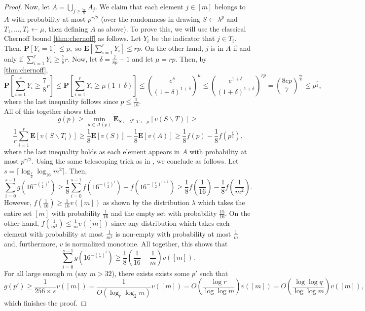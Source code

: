 \documentclass[11pt]{article}%
\numberwithin{theorem}{subsection}
\newcommand{\prob}{\mathbf{P}}
\newcommand{\expect}{\mathbf{E}}
\begin{document}
\begin{proof}
\noindent
Now, let $A = \bigcup_{j \ge \frac{7r}{8}}A_j.$ We claim that each element $j \in [m]$ belongs to $A$ with probability at most $p^{r/2}$ (over the randomness in drawing $S \leftarrow \lambda^p$ and $T_1,\ldots, T_r \leftarrow \mu$, then defining $A$ as above). To prove this, we will use the classical Chernoff bound \cref{thm:chernoff} as follows. Let $Y_i$ be the indicator that $j \in T_i.$ Then, 
$\prob[Y_i = 1]\le p,$ so 
$
\expect[\sum_{i = 1}^rY_i] \le rp.
$ On the other hand, $j$ is in $A$ if and only if 
$\sum_{i = 1}^rY_i\ge \frac{7}{8}r.$ Now, let 
$\delta  = \frac{7}{8p}-1$ and let $\mu = rp.$ Then, by \cref{thm:chernoff},
$$
\prob\left[\sum_{i = 1}^rY_i\ge \frac{7}{8}r\right] \le
\prob\left[\sum_{i = 1}^rY_i\ge \mu (1 + \delta)\right] \le 
\left(
\frac{e^{\delta}}{(1+\delta)^{1+\delta}}
\right)^\mu\le 
\left(
\frac{e^{1+\delta}}{(1+\delta)^{1+\delta}}
\right)^{rp} =
\left(\frac{8ep}{7}\right)^{\frac{7r}{8}}\le p^{\frac{r}{2}},
$$
where the last inequality follows since $p\le\frac{1}{16}.$\\

\noindent
All of this together shows that 
$$
g(p) \ge 
\min_{\mu \in \Delta(p)}\expect_{S\leftarrow \lambda^p, T\leftarrow \mu}[v(S\backslash T)]\ge 
$$
$$
\frac{1}{r}\sum_{i  = 1}^r \expect[v(S\backslash T_i)] \ge 
\frac{1}{8}\expect[v(S)] - 
\frac{1}{8}\expect[v(A)] \ge 
\frac{1}{8}f(p) - \frac{1}{8}f(p^{\frac{r}{2}}),
$$
where the last inequality holds as each element appears in $A$ with probability at most $p^{r/2}.$ Using the same telescoping trick as in \cite{DuttingKL20}, we conclude as follows. Let $s = \lceil\log_{\frac{r}{2}}\log_{16} m^2\rceil.$ Then,
$$
\sum_{i = 0}^{s-1} g(16^{-(\frac{r}{2})^i})\ge 
\frac{1}{8}\sum_{i = 0}^{s-1}
f(16^{-(\frac{r}{2})^i})- 
f(16^{-(\frac{r}{2})^{i+1}}) \ge
\frac{1}{8}f\left(\frac{1}{16}\right) - \frac{1}{8}f\left(\frac{1}{m^2}\right).
$$
However, $f(\frac{1}{16})\ge \frac{1}{16}v([m])$ as shown by the distribution $\lambda$ which takes the entire set $[m]$ with probability $\frac{1}{16}$ and the empty set with probability $\frac{15}{16}.$ On the other hand, $f(\frac{1}{m^2})\le \frac{1}{m}v([m])$ since any distribution which takes each element with probability at most $\frac{1}{m^2}$ is non-empty with probability at most $\frac{1}{m}$ and, furthermore, $v$ is normalized monotone. All together, this shows that 
$$
\sum_{i = 0}^{s-1} g(16^{-(\frac{r}{2})^i})\ge 
\frac{1}{8}(\frac{1}{16} - \frac{1}{m})v([m]).
$$
For all large enough $m$ (say $m>32$), there exists exists some $p'$ such that 
$$
g(p') \ge \frac{1}{256\times s}v([m]) = 
\frac{1}{O(\log_r\log_2 m)}v([m]) = 
O\left(\frac{\log r}{\log \log m}\right)v([m]) = 
O\left(\frac{\log \log q}{\log \log m}\right)v([m]),
$$
which finishes the proof.
\end{proof}
\end{document}
